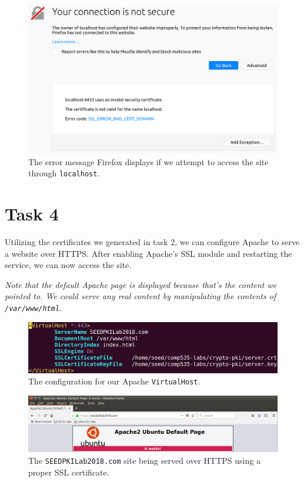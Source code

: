 \documentclass[12pt,letterpaper]{article}
\begin{document}
			\begin{figure}[h!]
				\includegraphics[width=\linewidth]{task-3-4-localhost}
				\caption{The error message Firefox displays if we attempt to access the site through \texttt{localhost}.}
			\end{figure}
		
	\section*{Task 4}
		Utilizing the certificates we generated in task 2, we can configure Apache to serve a website over HTTPS. After enabling Apache's SSL module and restarting the service, we can now access the site.
		
		\textit{Note that the default Apache page is displayed because that's the content we pointed to. We could serve any real content by manipulating the contents of \texttt{/var/www/html}.}
		
		\begin{figure}[h!]
			\includegraphics[width=\linewidth]{task-4-apache-config}
			\caption{The configuration for our Apache \texttt{VirtualHost}.}
		\end{figure}
	
		\begin{figure}[h!]
			\includegraphics[width=\linewidth]{task-4-web}
			\caption{The \texttt{SEEDPKILab2018.com} site being served over HTTPS using a proper SSL certificate.}
		\end{figure}
	
\end{document}
